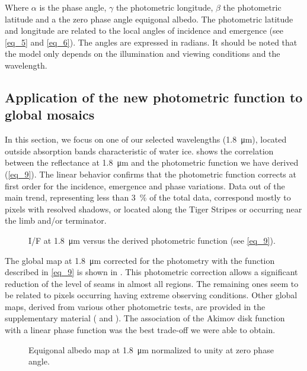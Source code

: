 \documentclass{arxiv-icarus}
\begin{document}
Where $\alpha$ is the phase angle, $\gamma$ the photometric longitude, $\beta$ the photometric latitude and a the zero phase angle equigonal albedo. The photometric latitude and longitude are related to the local angles of incidence and emergence (see \eqref{eq_5} and \eqref{eq_6}). The angles are expressed in radians. It should be noted that the model only depends on the illumination and viewing conditions and the wavelength.


\subsection{Application of the new photometric function to global mosaics}

In this section, we focus on one of our selected wavelengths (\SI{1.8}{\um}), located outside absorption bands characteristic of water ice.  shows the correlation between the reflectance at \SI{1.8}{\um} and the photometric function we have derived (\eqref{eq_9}). The linear behavior confirms that the photometric function corrects at first order for the incidence, emergence and phase variations. Data out of the main trend, representing less than \SI{3}{\percent} of the total data, correspond mostly to pixels with resolved shadows, or located along the Tiger Stripes or occurring near the limb and/or terminator.

\begin{figure}[!ht]
    \caption{I/F at \SI{1.8}{\um} versus the derived photometric function (see \eqref{eq_9}).}
    \label{fig:fig_6}
\end{figure}

The global map at \SI{1.8}{\um} corrected for the photometry with the function described in \eqref{eq_9} is shown in . This photometric correction allows a significant reduction of the level of seams in almost all regions. The remaining ones seem to be related to pixels occurring having extreme observing conditions. Other global maps, derived from various other photometric tests, are provided in the supplementary material ( and ). The association of the Akimov disk function with a linear phase function was the best trade-off we were able to obtain.

\begin{figure}[!ht]
    \caption{Equigonal albedo map at \SI{1.8}{\um} normalized to unity at zero phase angle.}
    \label{fig:fig_7}
\end{figure}
\end{document}
